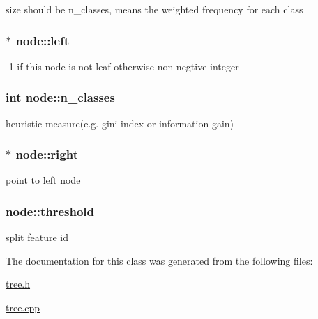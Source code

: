 size should be {\ttfamily n\+\_\+classes}, means the weighted frequency for each class \hypertarget{classnode_a7cbff55ff448f557223f79299056e9b1}{
\subsubsection[{left}]{$\ast$ node\+::left}}\label{classnode_a7cbff55ff448f557223f79299056e9b1}
-\/1 if this node is not leaf otherwise non-\/negtive integer \hypertarget{classnode_a8c4864582cb3fe15e84e7908d0965150}{
\subsubsection[{n\+\_\+classes}]{\setlength{\rightskip}{0pt plus 5cm}int node\+::n\+\_\+classes}}\label{classnode_a8c4864582cb3fe15e84e7908d0965150}
heuristic measure(e.\+g. gini index or information gain) \hypertarget{classnode_abdc86d4c8604c481752953af3235fc47}{
\subsubsection[{right}]{$\ast$ node\+::right}}\label{classnode_abdc86d4c8604c481752953af3235fc47}
point to left node \hypertarget{classnode_a3774a77cb58d1554f63f34cbcb737a0c}{
\subsubsection[{threshold}]{ node\+::threshold}}\label{classnode_a3774a77cb58d1554f63f34cbcb737a0c}
split feature id 

The documentation for this class was generated from the following files\+:\begin{DoxyCompactItemize}
\item 
\hyperlink{tree_8h}{tree.\+h}\item 
\hyperlink{tree_8cpp}{tree.\+cpp}\end{DoxyCompactItemize}
